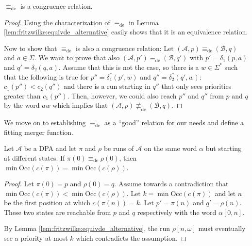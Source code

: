 \begin{lem}
	$\equiv_\text{de}$ is a congruence relation.
\end{lem}

\begin{proof}
	Using the characterization of $\equiv_\text{de}$ in Lemma \ref{lem:fritzwilke:equivde_alternative} easily shows that it is an equivalence relation.
	
	Now to show that $\equiv_\text{de}$ is also a congruence relation: Let $(\mathcal{A}, p) \equiv_\text{de} (\mathcal{B}, q)$ and $a \in \Sigma$. We want to prove that also $(\mathcal{A}, p') \equiv_\text{de} (\mathcal{B}, q')$ with $p' = \delta_1(p, a)$ and $q' = \delta_2(q, a)$. Assume that this is not the case, so there is a $w \in \Sigma^*$ such that the following is true for $p'' = \delta^*_1(p', w)$ and $q'' = \delta^*_2(q', w)$: $c_1(p'') < c_2(q'')$ and there is a run starting in $q''$ that only sees priorities greater than $c_1(p'')$. Then, however, we could also reach $p''$ and $q''$ from $p$ and $q$ by the word $aw$ which implies that $(\mathcal{A}, p) \not\equiv_\text{de} (\mathcal{B}, q)$.
\end{proof}

\vspace{15pt}

We move on to establishing $\equiv_\text{de}$ as a \enquote{good} relation for our needs and define a fitting merger function.

\begin{lem}
\label{lem:fritzwilke:equiv_states_same_minpri}
	Let $\mathcal{A}$ be a DPA and let $\pi$ and $\rho$ be runs of $\mathcal{A}$ on the same word $\alpha$ but starting at different states. If $\pi(0) \equiv_\text{de} \rho(0)$, then $\min \text{Occ}(c(\pi)) = \min \text{Occ}(c(\rho))$.
\end{lem}

\begin{proof}
	Let $\pi(0) = p$ and $\rho(0) = q$. Assume towards a contradiction that $\min \text{Occ}(c(\pi)) < \min \text{Occ}(c(\rho))$. Let $k = \min \text{Occ}(c(\pi))$ and let $n$ be the first position at which $c(\pi(n)) = k$. Let $p' = \pi(n)$ and $q' = \rho(n)$. These two states are reachable from $p$ and $q$ respectively with the word $\alpha[0,n]$.
	
	By Lemma \ref{lem:fritzwilke:equivde_alternative}, the run $\rho[n,\omega]$ must eventually see a priority at most $k$ which contradicts the assumption.
\end{proof}


